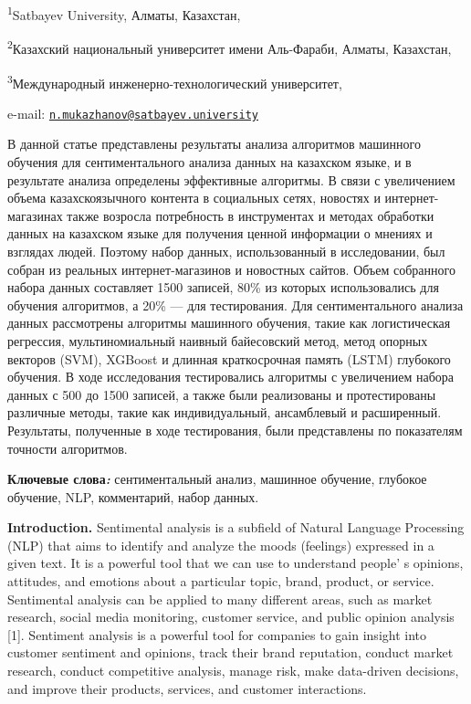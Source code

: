 \textsuperscript{1}Satbayev University, Алматы, Казахстан,

\textsuperscript{2}Казахский национальный университет имени Аль-Фараби,
Алматы, Казахстан,

\textsuperscript{3}Международный инженерно-технологический университет,

e-mail:
\href{mailto:n.mukazhanov@satbayev.university}{\nolinkurl{n.mukazhanov@satbayev.university}}

В данной статье представлены результаты анализа алгоритмов машинного
обучения для сентиментального анализа данных на казахском языке, и в
результате анализа определены эффективные алгоритмы. В связи с
увеличением объема казахскоязычного контента в социальных сетях,
новостях и интернет-магазинах также возросла потребность в инструментах
и методах обработки данных на казахском языке для получения ценной
информации о мнениях и взглядах людей. Поэтому набор данных,
использованный в исследовании, был собран из реальных интернет-магазинов
и новостных сайтов. Объем собранного набора данных составляет 1500
записей, 80\% из которых использовались для обучения алгоритмов, а 20\%
--- для тестирования. Для сентиментального анализа данных рассмотрены
алгоритмы машинного обучения, такие как логистическая регрессия,
мультиномиальный наивный байесовский метод, метод опорных векторов
(SVM), XGBoost и длинная краткосрочная память (LSTM) глубокого обучения.
В ходе исследования тестировались алгоритмы с увеличением набора данных
с 500 до 1500 записей, а также были реализованы и протестированы
различные методы, такие как индивидуальный, ансамблевый и расширенный.
Результаты, полученные в ходе тестирования, были представлены по
показателям точности алгоритмов.

{\bfseries Ключевые слова\emph{:}} сентиментальный анализ, машинное
обучение, глубокое обучение, NLP, комментарий, набор данных.

{\bfseries Introduction.} Sentimental analysis is a subfield of Natural
Language Processing (NLP) that aims to identify and analyze the moods
(feelings) expressed in a given text. It is a powerful tool that we can
use to understand people' s opinions, attitudes, and
emotions about a particular topic, brand, product, or service.
Sentimental analysis can be applied to many different areas, such as
market research, social media monitoring, customer service, and public
opinion analysis {[}1{]}. Sentiment analysis is a powerful tool for
companies to gain insight into customer sentiment and opinions, track
their brand reputation, conduct market research, conduct competitive
analysis, manage risk, make data-driven decisions, and improve their
products, services, and customer interactions.

